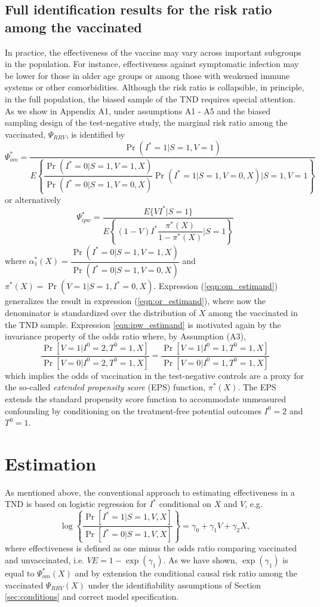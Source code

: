 \documentclass[11pt]{article}
\begin{document}
\subsection{Full identification results for the risk ratio among the vaccinated}
In practice, the effectiveness of the vaccine may vary across important subgroups in the population. For instance, effectiveness against symptomatic infection may be lower for those in older age groups or among those with weakened immune systems or other comorbidities. Although the risk ratio is collapsible, in principle, in the full population, the biased sample of the TND requires special attention. As we show in Appendix A1, under assumptions A1 - A5 and the biased sampling design of the test-negative study, the marginal risk ratio among the vaccinated, $\Psi_{RRV}$, is identified by
\begin{equation}\label{eqn:om_estimand}
    \Psi_{om}^* = \dfrac{\Pr(I^* = 1 | S = 1, V = 1)}{E\left\{  \dfrac{\Pr(I^* = 0 | S = 1, V = 1, X)}{\Pr(I^* = 0| S = 1, V = 0, X)}\Pr(I^* = 1 | S = 1, V = 0, X) \Big| S = 1, V = 1 \right\}}
\end{equation}
or alternatively 
\begin{equation}\label{eqn:ipw_estimand}
    \Psi_{ipw}^* = \dfrac{E\{VI^*|S =1\}}{E\left\{ (1 - V) I^* \dfrac{\pi^*(X)}{1 - \pi^*(X)} \bigg| S = 1\right\}}
\end{equation}
where $\alpha^*_1(X) = \dfrac{\Pr(I^* = 0 | S = 1, V = 1, X)}{\Pr(I^* = 0| S = 1, V = 0, X)}$ and $\pi^*(X) = \Pr(V = 1| S = 1, I^* = 0, X)$. Expression (\ref{eqn:om_estimand}) generalizes the result in expression (\ref{eqn:or_estimand}), where now the denominator is standardized over the distribution of $X$ among the vaccinated in the TND sample. Expression \ref{eqn:ipw_estimand} is motivated again by the invariance property of the odds ratio where, by Assumption (A3), 
$$\frac{\Pr[V = 1 | I^0 = 2, T^0 = 1, X]}{\Pr[ V = 0 | I^0 = 2, T^0 = 1, X]} =\frac{\Pr[V = 1 | I^0 = 1, T^0 = 1, X]}{\Pr[V = 0 | I^0 = 1, T^0 = 1, X]}$$
which implies the odds of vaccination in the test-negative controls are a proxy for the so-called \textit{extended propensity score} (EPS) function, $\pi^*(X)$. The EPS extends the standard propensity score function to accommodate unmeasured confounding by conditioning on the treatment-free potential outcomes $I^0 = 2$ and $T^0 = 1$. 

\section{Estimation}
As mentioned above, the conventional approach to estimating effectiveness in a TND is based on logistic regression for $I^*$ conditional on $X$ and $V$, e.g.
$$\log \left\{\dfrac{\Pr[I^* = 1 | S = 1, V, X]}{\Pr[I^* = 0 | S = 1, V, X]}\right\} = \gamma_0 + \gamma_1 V + \gamma_2 X,$$
where effectiveness is defined as one minus the odds ratio comparing vaccinated and unvaccinated, i.e. $VE = 1 - \exp(\gamma_1)$. As we have shown, $ \exp(\gamma_1)$ is equal to $\Psi^*_{om}(X)$ and by extension the conditional causal risk ratio among the vaccinated $\Psi_{RRV}(X)$ under the identifiability assumptions of Section \ref{sec:conditions} and correct model specification. 
\end{document}
